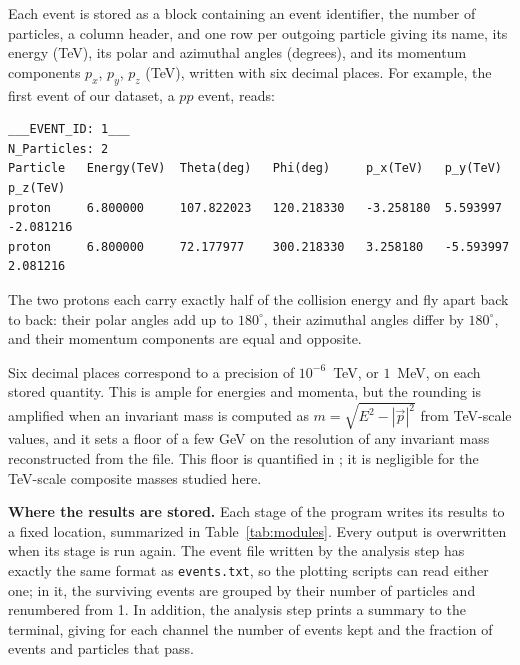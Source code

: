 \documentclass{article}
\begin{document}
Each event is stored as a block containing an event identifier, the number of particles, a column header, and one row per outgoing particle giving its name, its energy (TeV), its polar and azimuthal angles (degrees), and its momentum components $p_x$, $p_y$, $p_z$ (TeV), written with six decimal places. For example, the first event of our dataset, a $pp$ event, reads:

{\fontsize{8}{8.5}\selectfont
\begin{verbatim}
___EVENT_ID: 1___
N_Particles: 2
Particle   Energy(TeV)  Theta(deg)   Phi(deg)     p_x(TeV)   p_y(TeV)   p_z(TeV)
proton     6.800000     107.822023   120.218330   -3.258180  5.593997   -2.081216
proton     6.800000     72.177977    300.218330   3.258180   -5.593997  2.081216
\end{verbatim}
}

\noindent The two protons each carry exactly half of the collision energy and fly apart back to back: their polar angles add up to $180^\circ$, their azimuthal angles differ by $180^\circ$, and their momentum components are equal and opposite.

Six decimal places correspond to a precision of $10^{-6}$~TeV, or $1$~MeV, on each stored quantity. This is ample for energies and momenta, but the rounding is amplified when an invariant mass is computed as $m = \sqrt{E^2 - |\vec{p}|^2}$ from TeV-scale values, and it sets a floor of a few GeV on the resolution of any invariant mass reconstructed from the file. This floor is quantified in ; it is negligible for the TeV-scale composite masses studied here.

\par\textbf{Where the results are stored.} Each stage of the program writes its results to a fixed location, summarized in Table~\ref{tab:modules}. Every output is overwritten when its stage is run again. The event file written by the analysis step has exactly the same format as \texttt{events.txt}, so the plotting scripts can read either one; in it, the surviving events are grouped by their number of particles and renumbered from 1. In addition, the analysis step prints a summary to the terminal, giving for each channel the number of events kept and the fraction of events and particles that pass.
\end{document}
